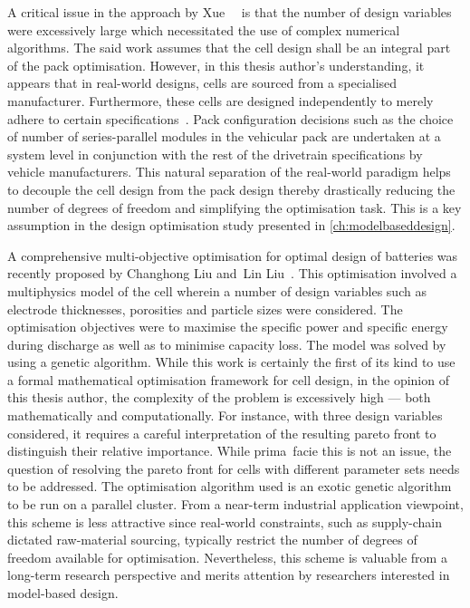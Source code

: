 A critical issue in the approach  by Xue~\etal~\cite{Xue2014} is that the number
of design variables were excessively large which necessitated the use of complex
numerical  algorithms.  The  said  work  assumes  that  the  cell  design  shall
be  an  integral  part  of  the  pack  optimisation.  However,  in  this  thesis
author's  understanding,  it  appears  that in  real-world  designs,  cells  are
sourced from a  specialised manufacturer. Furthermore, these  cells are designed
independently to merely  adhere to certain specifications~\cite{Maksimovic2012}.
Pack configuration  decisions such  as the choice  of number  of series-parallel
modules in  the vehicular pack are  undertaken at a system  level in conjunction
with the  rest of the  drivetrain specifications by vehicle  manufacturers. This
natural separation of the real-world paradigm  helps to decouple the cell design
from  the pack  design thereby  drastically reducing  the number  of degrees  of
freedom and simplifying  the optimisation task. This is a  key assumption in the
design optimisation study presented in \cref{ch:modelbaseddesign}.

A  comprehensive multi-objective  optimisation for  optimal design  of batteries
was  recently  proposed  by  Changhong  Liu  and~Lin  Liu~\cite{Liu2017b}.  This
optimisation  involved a  multiphysics model  of the  cell wherein  a number  of
design variables  such as electrode  thicknesses, porosities and  particle sizes
were considered. The optimisation objectives were to maximise the specific power
and specific energy  during discharge as well as to  minimise capacity loss. The
model was solved by using a genetic  algorithm. While this work is certainly the
first of its  kind to use a formal mathematical  optimisation framework for cell
design, in the opinion  of this thesis author, the complexity  of the problem is
excessively high --- both mathematically and computationally. For instance, with
three  design variables  considered,  it requires  a  careful interpretation  of
the  resulting pareto  front  to distinguish  their  relative importance.  While
prima~facie this is not an issue, the question of resolving the pareto front for
cells  with different  parameter sets  needs to  be addressed.  The optimisation
algorithm  used  is  an  exotic  genetic  algorithm to  be  run  on  a  parallel
cluster.  From a  near-term  industrial application  viewpoint,  this scheme  is
less  attractive since  real-world  constraints, such  as supply-chain  dictated
raw-material  sourcing, typically  restrict  the number  of  degrees of  freedom
available  for  optimisation.  Nevertheless,  this scheme  is  valuable  from  a
long-term research perspective and merits attention by researchers interested in
model-based design.

